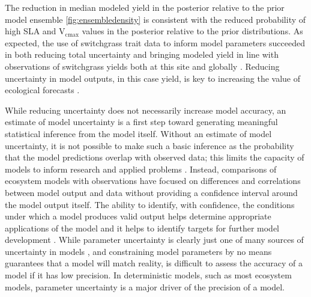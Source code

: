 \documentclass[12pt]{article}
\begin{document}
\begin{flushleft}
\begin{spacing}{1.9}
 The reduction in median modeled yield in the posterior relative to the prior model ensemble \ref{fig:ensembledensity} is consistent with the reduced probability of high SLA and V$_{\text{cmax}}$ values in the posterior relative to the prior distributions.
 As expected, the use of switchgrass trait data to inform model parameters succeeded in both reducing total uncertainty and bringing modeled yield in line with observations of switchgrass yields both at this site \citep{heaton2008mub} and globally \citep{wang2010qrc}.
 Reducing uncertainty in model outputs, in this case yield, is key to increasing the value of ecological forecasts \citep{clark2001efe}.

  While reducing uncertainty does not necessarily increase model accuracy, an estimate of model uncertainty is a first step toward generating meaningful statistical inference from the model itself.
 Without an estimate of model uncertainty, it is not possible to make such a basic inference as the probability that the model predictions overlap with observed data; this limits the capacity of models to inform research and applied problems \citep{clark2001efe}.
 Instead, comparisons of ecosystem models with observations have focused on differences and correlations between model output and data \citep{bellocchi2009vpm,schwalm2010mdi,dietze2011cpe} without providing a confidence interval around the model output itself. The ability to identify, with confidence, the conditions under which a model produces valid output helps determine appropriate applications of the model and it helps to identify targets for further model development \citep{williams2009ils}.
 While parameter uncertainty is clearly just one of many sources of uncertainty in models \citep{mcmahon2009pfu}, and constraining model parameters by no means guarantees that a model will match reality, is difficult to assess the accuracy of a model if it has low precision. 
 In deterministic models, such as most ecosystem models, parameter uncertainty is a major driver of the precision of a model.


\end{spacing}
\end{flushleft}
\end{document}
